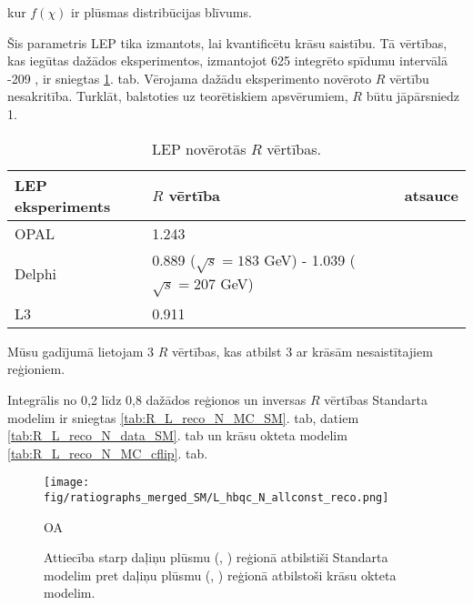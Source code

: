kur $f(\chi)$ ir plūsmas distribūcijas blīvums.

Šis parametris LEP tika izmantots, lai kvantificētu krāsu saistību. Tā vērtības, kas iegūtas dažādos eksperimentos, izmantojot 625 \pbinv integrēto spīdumu intervālā -209 \GeV, ir sniegtas \ref{tab:LEP_R}. tab. Vērojama dažādu eksperimento novēroto $R$ vērtību nesakritība. Turklāt, balstoties uz teorētiskiem apsvērumiem, $R$ būtu jāpārsniedz 1.

\begin{table}
\centering
\begin{tabular}{lll}
LEP eksperiments & $R$ vērtība                                             & atsauce\\
\hline
    OPAL         & 1.243                                                   & \cite{Abbiendi:2005es}\\
    Delphi       & 0.889 ($\sqrt{s}=183$ GeV) - 1.039 ($\sqrt{s}=207$ GeV) & \cite{Abdallah:2006uq}\\
    L3           & 0.911                                                   & \cite{Achard:2003pe}\\
  \end{tabular}
\caption{LEP novērotās $R$ vērtības.}
\label{tab:LEP_R}
\end{table} 

Mūsu gadījumā lietojam 3 $R$ vērtības, kas atbilst 3 ar krāsām nesaistītajiem reģioniem.

Integrālis no 0,2 līdz 0,8 dažādos reģionos un inversas $R$ vērtības Standarta modelim ir sniegtas \ref{tab:R_L_reco_N_MC_SM}. tab, datiem \ref{tab:R_L_reco_N_data_SM}. tab un krāsu okteta \PW modelim \ref{tab:R_L_reco_N_MC_cflip}. tab.



\begin{figure}[htpb]
\def\twidth{0.45}
\centering
\texttt{[image: fig/ratiographs\_merged\_SM/L\_hbqc\_N\_allconst\_reco.png]}
\caption{Attiecība starp daļiņu plūsmu (\leadingjet, \scndleadingjet) reģionā atbilstiši Standarta modelim pret daļiņu plūsmu (\leadingjet, \scndleadingjet) reģionā atbilstoši krāsu okteta \PW modelim.}
\label{fig:ratio_hbqc}OA
\end{figure}

\clearpage








